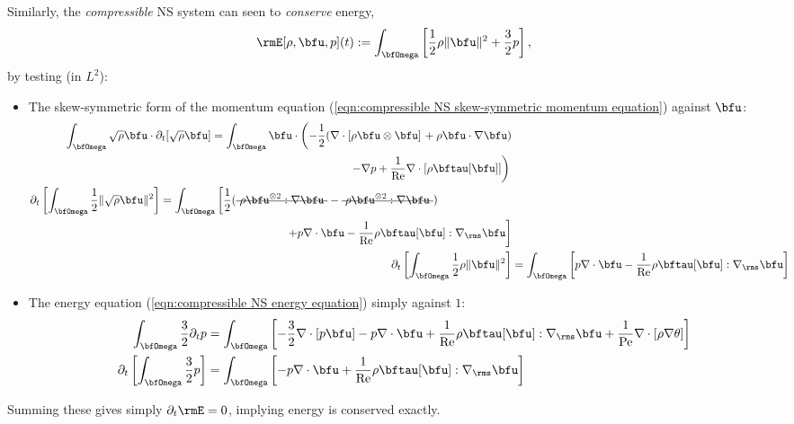     Similarly, the \emph{compressible} NS system can seen to \emph{conserve} energy,
    \begin{equation}\label{eqn:compressible NS energy definition 1}
        \rmE[\rho, \bfu, p](t)  :=  \int_{\bfOmega}\left[\frac{1}{2}\rho\|\bfu\|^{2} + \frac{3}{2}p\right],
    \end{equation}
    by testing (in $L^{2}$):
    \begin{itemize}
        \item  The skew-symmetric form of the momentum equation (\ref{eqn:compressible NS skew-symmetric momentum equation}) against $\bfu$:
        \begin{align}
            \begin{split}
                \int_{\bfOmega}\sqrt{\rho}\bfu\cdot\partial_{t}[\sqrt{\rho}\bfu]  &=  \int_{\bfOmega}\bfu\cdot\left(- \frac{1}{2}(\nabla\cdot\left[\rho\bfu\otimes\bfu\right]\right. + \rho\bfu\cdot\nabla\bfu)  \\
                &\;\;\;\;\;\;\;\;\;\;\;\;\;\;\;\;\;\;\;\;\;\;\;\;\;\;\;\;\;\;\;\;\;\;\;\;\;\;\;\;\;\;\;\;\left.- \nabla p + \frac{1}{\rmRe}\nabla\cdot[\rho\bftau[\bfu]]\right)
            \end{split}  \\
            \begin{split}
                \partial_{t}\left[\int_{\bfOmega}\frac{1}{2}\|\sqrt{\rho}\bfu\|^{2}\right]  &=  \int_{\bfOmega}\left[\frac{1}{2}(\mst{\rho\bfu^{\otimes 2}:\nabla\bfu} - \mst{\rho\bfu^{\otimes 2}:\nabla\bfu})\right.  \\
                &\;\;\;\;\;\;\;\;\;\;\;\;\;\;\;\;\;\;\;\;\;\;\;\;\;\;\;\;\;\;\;\;\;\;\;\;\;\;\;\;\left.+ p\nabla\cdot\bfu - \frac{1}{\rmRe}\rho\bftau[\bfu]:\nabla_{\rms}\bfu\right]
            \end{split}  \\
            \partial_{t}\left[\int_{\bfOmega}\frac{1}{2}\rho\|\bfu\|^{2}\right]  &=  \int_{\bfOmega}\left[p\nabla\cdot\bfu - \frac{1}{\rmRe}\rho\bftau[\bfu]:\nabla_{\rms}\bfu\right]
        \end{align}
        \item  The energy equation (\ref{eqn:compressible NS energy equation}) simply against $1$:
        \begin{align}
            \int_{\bfOmega}\frac{3}{2}\partial_{t}p  &=  \int_{\bfOmega}\left[- \frac{3}{2}\nabla\cdot[p\bfu] - p\nabla\cdot\bfu + \frac{1}{\rmRe}\rho\bftau[\bfu]:\nabla_{\rms}\bfu + \frac{1}{\rmPe}\nabla\cdot[\rho\nabla\theta]\right]  \\
            \partial_{t}\left[\int_{\bfOmega}\frac{3}{2}p\right]  &=  \int_{\bfOmega}\left[- p\nabla\cdot\bfu + \frac{1}{\rmRe}\rho\bftau[\bfu]:\nabla_{\rms}\bfu\right]
        \end{align}
    \end{itemize}
    Summing these gives simply $\partial_{t}\rmE  =  0$, implying energy is conserved exactly.

